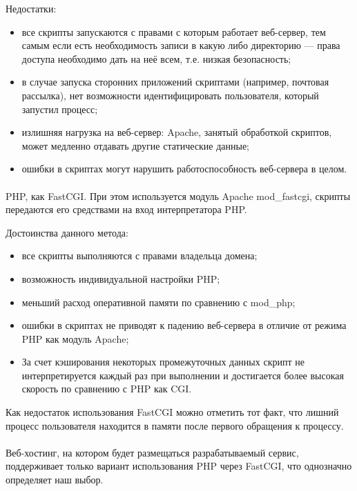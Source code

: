 Недостатки:
\begin{itemize}
\item все скрипты запускаются с правами с которым работает веб-сервер, 
  тем самым если есть необходимость записи в какую либо директорию ---
  права доступа необходимо дать на неё всем, т.е. низкая безопасность;
\item
  в случае запуска сторонних приложений скриптами (например, почтовая рассылка),
  нет возможности идентифицировать пользователя,
  который запустил процесс;
\item
  излишняя нагрузка на веб-сервер: Apache, занятый обработкой скриптов,
  может медленно отдавать другие статические данные;
\item
  ошибки в скриптах могут нарушить работоспособность веб-сервера в целом.
\end{itemize}

\paragraph{}
PHP, как FastCGI. При этом используется модуль Apache mod\_fastcgi,
скрипты передаются его средствами на вход интерпретатора PHP.

Достоинства данного метода:
\begin{itemize}
\item
  все скрипты выполняются с правами владельца домена;
\item
  возможность индивидуальной настройки PHP;
\item
  меньший расход оперативной памяти по сравнению с mod\_php;
\item
  ошибки в скриптах не приводят к падению веб-сервера в отличие от режима PHP как модуль Apache;
\item
  За счет кэширования некоторых промежуточных данных скрипт не интерпретируется каждый раз при выполнении
  и достигается более высокая скорость по сравнению с PHP как CGI.
\end{itemize}

Как недостаток использования FastCGI можно отметить тот факт,
что лишний процесс пользователя находится в памяти после первого обращения
к процессу.

\paragraph{}
Веб-хостинг, на котором будет размещаться разрабатываемый сервис, поддерживает только вариант использования PHP через FastCGI,
что однозначно определяет наш выбор.

